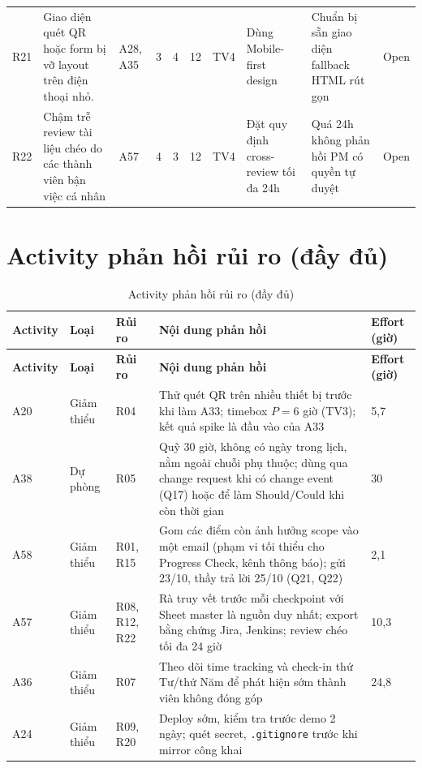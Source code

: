 \begin{landscape}
\begin{longtable}{L{0.70cm}L{3.82cm}L{1.61cm}L{0.30cm}L{0.30cm}L{0.90cm}L{1.31cm}L{4.23cm}L{3.32cm}L{1.31cm}}
R21 & Giao diện quét QR hoặc form bị vỡ layout trên điện thoại nhỏ. & A28, A35 & 3 & 4 & 12 & TV4 & Dùng Mobile-first design & Chuẩn bị sẵn giao diện fallback HTML rút gọn & Open \\
R22 & Chậm trễ review tài liệu chéo do các thành viên bận việc cá nhân & A57 & 4 & 3 & 12 & TV4 & Đặt quy định cross-review tối đa 24h & Quá 24h không phản hồi PM có quyền tự duyệt & Open \\
\end{longtable}
\endgroup

\section{Activity phản hồi rủi ro (đầy đủ)}
\begingroup\tblsetup\footnotesize\renewcommand{\arraystretch}{1.1}\tblzebra
\begin{longtable}{L{2.19cm}L{2.78cm}L{2.34cm}L{10.83cm}L{1.76cm}}
\caption{Activity phản hồi rủi ro (đầy đủ)}\label{tab:risk-response}\\
\toprule
{}\textbf{Activity} & \textbf{Loại} & \textbf{Rủi ro} & \textbf{Nội dung phản hồi} & \textbf{Effort (giờ)} \\
\midrule
\endfirsthead
\toprule
{}\textbf{Activity} & \textbf{Loại} & \textbf{Rủi ro} & \textbf{Nội dung phản hồi} & \textbf{Effort (giờ)} \\
\midrule
\endhead
\bottomrule
\endlastfoot
A20 & Giảm thiểu & R04 & Thử quét QR trên nhiều thiết bị trước khi làm A33; timebox $P = 6$ giờ (TV3); kết quả spike là đầu vào của A33 & 5,7 \\
A38 & Dự phòng & R05 & Quỹ 30 giờ, không có ngày trong lịch, nằm ngoài chuỗi phụ thuộc; dùng qua change request khi có change event (Q17) hoặc để làm Should/Could khi còn thời gian & 30 \\
A58 & Giảm thiểu & R01, R15 & Gom các điểm còn ảnh hưởng scope vào một email (phạm vi tối thiểu cho Progress Check, kênh thông báo); gửi 23/10, thầy trả lời 25/10 (Q21, Q22) & 2,1 \\
A57 & Giảm thiểu & R08, R12, R22 & Rà truy vết trước mỗi checkpoint với Sheet master là nguồn duy nhất; export bằng chứng Jira, Jenkins; review chéo tối đa 24 giờ & 10,3 \\
A36 & Giảm thiểu & R07 & Theo dõi time tracking và check-in thứ Tư/thứ Năm để phát hiện sớm thành viên không đóng góp & 24,8 \\
A24 & Giảm thiểu & R09, R20 & Deploy sớm, kiểm tra trước demo 2 ngày; quét secret, \texttt{.gitignore} trước khi mirror công khai &  \\

\end{longtable}
\end{landscape}
